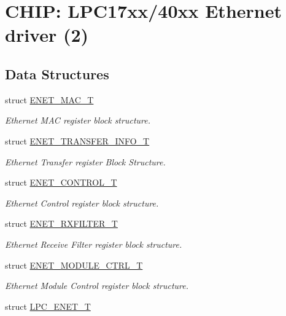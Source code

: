 \hypertarget{group__ENET__17XX__40XX}{\section{C\-H\-I\-P\-: L\-P\-C17xx/40xx Ethernet driver (2)}
\label{group__ENET__17XX__40XX}
}
\subsection*{Data Structures}
\begin{DoxyCompactItemize}
\item 
struct \hyperlink{structENET__MAC__T}{E\-N\-E\-T\-\_\-\-M\-A\-C\-\_\-\-T}
\begin{DoxyCompactList}\small\item\em Ethernet M\-A\-C register block structure. \end{DoxyCompactList}\item 
struct \hyperlink{structENET__TRANSFER__INFO__T}{E\-N\-E\-T\-\_\-\-T\-R\-A\-N\-S\-F\-E\-R\-\_\-\-I\-N\-F\-O\-\_\-\-T}
\begin{DoxyCompactList}\small\item\em Ethernet Transfer register Block Structure. \end{DoxyCompactList}\item 
struct \hyperlink{structENET__CONTROL__T}{E\-N\-E\-T\-\_\-\-C\-O\-N\-T\-R\-O\-L\-\_\-\-T}
\begin{DoxyCompactList}\small\item\em Ethernet Control register block structure. \end{DoxyCompactList}\item 
struct \hyperlink{structENET__RXFILTER__T}{E\-N\-E\-T\-\_\-\-R\-X\-F\-I\-L\-T\-E\-R\-\_\-\-T}
\begin{DoxyCompactList}\small\item\em Ethernet Receive Filter register block structure. \end{DoxyCompactList}\item 
struct \hyperlink{structENET__MODULE__CTRL__T}{E\-N\-E\-T\-\_\-\-M\-O\-D\-U\-L\-E\-\_\-\-C\-T\-R\-L\-\_\-\-T}
\begin{DoxyCompactList}\small\item\em Ethernet Module Control register block structure. \end{DoxyCompactList}\item 
struct \hyperlink{structLPC__ENET__T}{L\-P\-C\-\_\-\-E\-N\-E\-T\-\_\-\-T}

\end{DoxyCompactItemize}
